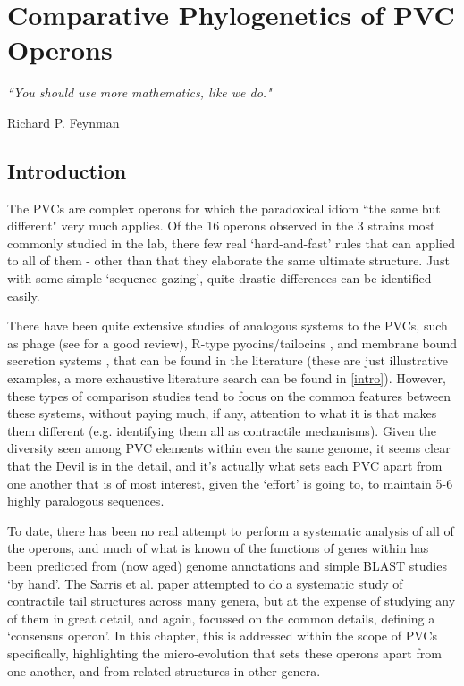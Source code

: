 \chapter{Comparative Phylogenetics of PVC Operons}\label{bioinformatics}

\epigraph{\textit{``You should use more mathematics, like we do."}}{Richard P. Feynman}

\section{Introduction}
The PVCs are complex operons for which the paradoxical idiom ``the same but different" very much applies. Of the 16 operons  observed in the 3 strains most commonly studied in the lab, there few real `hard-and-fast' rules that can applied to all of them - other than that they elaborate the same ultimate structure. Just with some simple `sequence-gazing', quite drastic differences can be identified easily.

There have been quite extensive studies of analogous systems to the PVCs, such as phage (see \citep{Yap2014} for a good review), R-type pyocins/tailocins \citep{Ge2015, Ghequire2015}, and membrane bound secretion systems \citep{Cascales2012}, that can be found in the literature \citep{Sarris2014, Kube2015} (these are just illustrative examples, a more exhaustive literature search can be found in \vref{intro}). However, these types of comparison studies tend to focus on the common features between these systems, without paying much, if any, attention to what it is that makes them different (e.g. identifying them all as contractile mechanisms). Given the diversity seen among PVC elements within even the same genome, it seems clear that the Devil is in the detail, and it's actually what sets each PVC apart from one another that is of most interest, given the `effort' \Pa{} is going to, to maintain 5-6 highly paralogous sequences.

To date, there has been no real attempt to perform a systematic analysis of all of the operons, and much of what is known of the functions of genes within has been predicted from (now aged) genome annotations and simple BLAST studies `by hand'. The Sarris et al. paper attempted to do a systematic study of contractile tail structures across many genera, but at the expense of studying any of them in great detail, and again, focussed on the common details, defining a `consensus operon'. In this chapter, this is addressed within the scope of PVCs specifically, highlighting the micro-evolution that sets these operons apart from one another, and from related structures in other genera.

